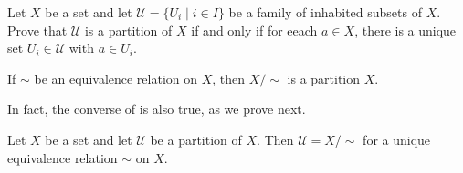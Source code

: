 \begin{exercise}
\label{exConditionsForPartition}
Let $X$ be a set and let $\mathcal{U} = \{ U_i \mid i \in I \}$ be a family of inhabited subsets of $X$. Prove that $\mathcal{U}$ is a partition of $X$ if and only if for eeach $a \in X$, there is a unique set $U_i \in \mathcal{U}$ with $a \in U_i$.
\end{exercise}

\begin{exercise}
\label{exQuotientIsPartition}
If $\sim$ be an equivalence relation on $X$, then $X/{\sim}$ is a partition $X$.
\end{exercise}

In fact, the converse of  is also true, as we prove next.

\begin{proposition}
\label{propPartitionIsQuotientByEquivalenceRelation}
Let $X$ be a set and let $\mathcal{U}$ be a partition of $X$. Then $\mathcal{U}=X/{\sim}$ for a unique equivalence relation $\sim$ on $X$.
\end{proposition}

